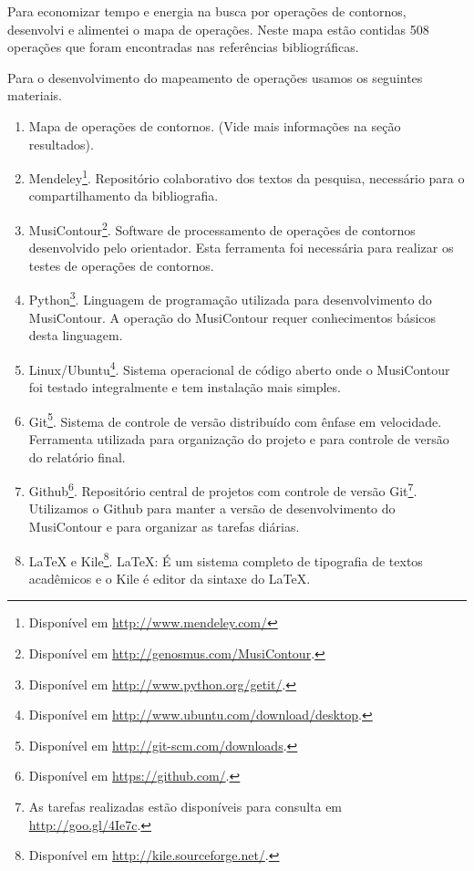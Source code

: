\documentclass[11pt]{article}
\begin{document}
Para economizar tempo e energia na busca por operações de contornos,
desenvolvi e alimentei o mapa de operações.
Neste mapa estão contidas 508 operações que foram
encontradas nas referências bibliográficas.

\label{sec:materiais}

Para o desenvolvimento do mapeamento de operações usamos os seguintes
materiais.

\begin{enumerate}
\item Mapa de operações de contornos. (Vide mais informações na seção
  resultados).
\item Mendeley\footnote{Disponível em
    \url{http://www.mendeley.com/}}. Repositório colaborativo dos
  textos da pesquisa, necessário para o compartilhamento da bibliografia.
\item MusiContour\footnote{Disponível em
    \url{http://genosmus.com/MusiContour}.}. Software de processamento
  de operações de contornos desenvolvido pelo orientador. Esta
  ferramenta foi necessária para realizar os testes de operações de
  contornos.
\item Python\footnote{Disponível em
    \url{http://www.python.org/getit/}.}. Linguagem de programação
  utilizada para desenvolvimento do MusiContour. A operação do
  MusiContour requer conhecimentos básicos desta linguagem.
\item Linux/Ubuntu\footnote{Disponível em
    \url{http://www.ubuntu.com/download/desktop}.}. Sistema
  operacional de código aberto onde o MusiContour foi testado
  integralmente e tem instalação mais simples.
\item Git\footnote{Disponível em
    \url{http://git-scm.com/downloads}.}. Sistema de controle de
  versão distribuído com ênfase em velocidade. Ferramenta utilizada
  para organização do projeto e para controle de versão do relatório
  final.
\item Github\footnote{Disponível em
    \url{https://github.com/}.}. Repositório central de projetos com
  controle de versão Git\footnote{As tarefas realizadas estão
    disponíveis para consulta em \url{http://goo.gl/4Ie7c}.}.
  Utilizamos o Github para manter a versão de desenvolvimento do
  MusiContour e para organizar as tarefas diárias.
\item \LaTeX{} e Kile\footnote{Disponível em
    \url{http://kile.sourceforge.net/}.}. \LaTeX: É um sistema
  completo de tipografia de textos acadêmicos e o Kile é editor da
  sintaxe do \LaTeX.
\end{enumerate}
\end{document}
